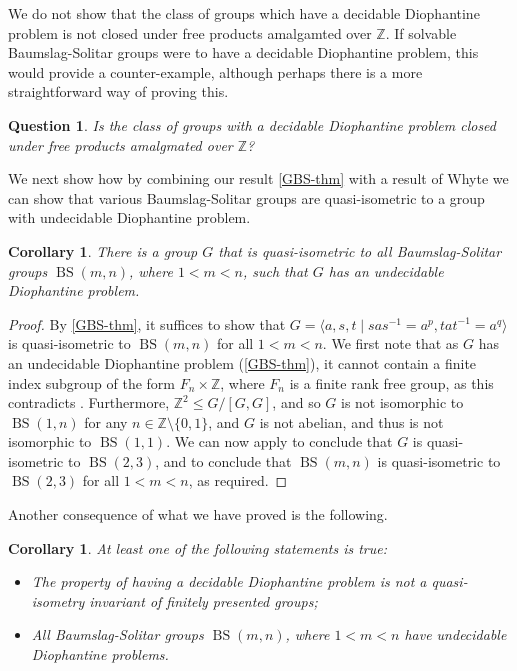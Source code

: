 \documentclass[11pt]{amsart}
\newtheorem{cor}[theorem]{Corollary}
\newtheorem{qu}[theorem]{Question}
\theoremstyle{definition}
\numberwithin{theorem}{section}
\DeclareMathOperator{\BS}{BS}
\newcommand{\Z}{\mathbb{Z}}
\begin{document}
	We do not show that the class of groups which have a decidable Diophantine problem
	is not closed under free products amalgamted over \(\Z\). If solvable Baumslag-Solitar
	groups were to have a decidable Diophantine problem, this would provide a
	counter-example, although perhaps there is a more straightforward way of proving this.

	\begin{qu}
		Is the class of groups with a decidable Diophantine problem closed under
		free products amalgmated over \(\Z\)?
	\end{qu}

We next show how by combining our result \cref{GBS-thm} with a result of Whyte \cite{Whyte01} we can show that various Baumslag-Solitar groups are quasi-isometric to a group with undecidable Diophantine problem. 

\begin{cor}
There is a group \(G\) that is quasi-isometric to all Baumslag-Solitar groups \(\BS(m, n)\), where \(1 < m < n\), such that \(G\) has an undecidable Diophantine problem.
	\end{cor}

	\begin{proof}
		By \cref{GBS-thm}, it suffices to show that \(G = \langle a, s, t \mid
		sas^{-1} = a^p, tat^{-1} = a^q \rangle\) is quasi-isometric to \(\BS(m,
		n)\) for all \(1 < m < n\). We first note that as \(G\) has an
		undecidable Diophantine problem (\cref{GBS-thm}), it cannot contain a
		finite index subgroup of the form \(F_n \times \Z\), where \(F_n\) is a
		finite rank free group, as this contradicts
		\cite[Theorem 3.1]{CiobanuHoltRees}. Furthermore, \(\Z^2 \leq G / [G, G]\),
		and so \(G\) is not isomorphic to \(\BS(1, n)\) for any \(n \in \Z \setminus \{0, 1\}\),
		and \(G\) is not abelian, and thus is not isomorphic to \(\BS(1, 1)\). We
		can now apply \cite[Theorem 0.1]{Whyte01} to conclude that \(G\) is
		quasi-isometric to \(\BS(2, 3)\), and \cite[Corollary 0.2]{Whyte01} to
		conclude that \(\BS(m, n)\) is quasi-isometric to \(\BS(2, 3)\) for
		all \(1 < m < n\), as required.
	\end{proof}

Another consequence of what we have proved is the following. 

\begin{cor} 
At least one of the following statements is true: 
\begin{itemize} 
\item 
The property of having a decidable Diophantine problem is not a quasi-isometry invariant of finitely presented groups; 
\item All Baumslag-Solitar groups \(\BS(m, n)\), where \(1 < m < n\) have undecidable Diophantine problems. 
  \end{itemize} 
  \end{cor}
\end{document}
